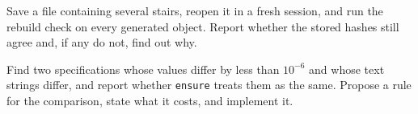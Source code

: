 \begin{exercise}
Save a file containing several stairs, reopen it in a fresh session, and run the rebuild check on every generated object. Report whether the stored hashes still agree and, if any do not, find out why.
\end{exercise}

\begin{exercise}
Find two specifications whose values differ by less than $10^{-6}$ and whose text strings differ, and report whether \texttt{ensure} treats them as the same. Propose a rule for the comparison, state what it costs, and implement it.
\end{exercise}
